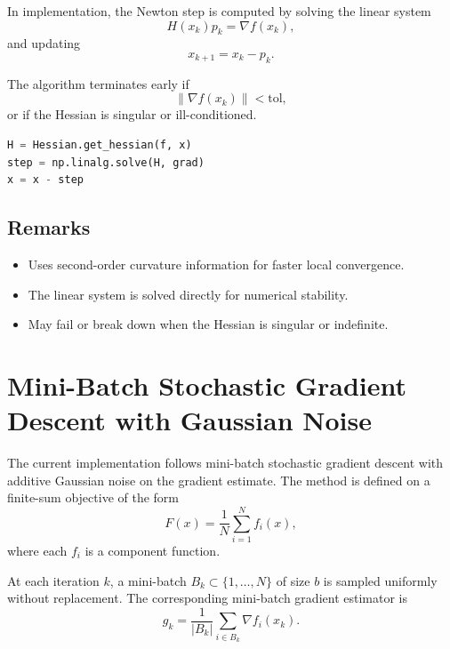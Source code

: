 \documentclass[12pt,a4paper]{report}
\begin{document}
In implementation, the Newton step is computed by solving the linear system
\begin{equation}
H(x_k) p_k = \nabla f(x_k),
\end{equation}
and updating
\begin{equation}
x_{k+1} = x_k - p_k.
\end{equation}

The algorithm terminates early if
\begin{equation}
\|\nabla f(x_k)\| < \text{tol},
\end{equation}
or if the Hessian is singular or ill-conditioned.

\begin{lstlisting}[language=Python]
H = Hessian.get_hessian(f, x)
step = np.linalg.solve(H, grad)
x = x - step
\end{lstlisting}

\subsection*{Remarks}
\begin{itemize}
    \item Uses second-order curvature information for faster local convergence.
    \item The linear system is solved directly for numerical stability.
    \item May fail or break down when the Hessian is singular or indefinite.
\end{itemize}

\section{Mini-Batch Stochastic Gradient Descent with Gaussian Noise}

The current implementation follows mini-batch stochastic gradient descent with additive Gaussian noise on the gradient estimate. The method is defined on a finite-sum objective of the form
\begin{equation}
F(x) = \frac{1}{N}\sum_{i=1}^{N} f_i(x),
\end{equation}
where each $f_i$ is a component function.

At each iteration $k$, a mini-batch $B_k \subset \{1,\dots,N\}$ of size $b$ is sampled uniformly without replacement. The corresponding mini-batch gradient estimator is
\begin{equation}
g_k = \frac{1}{|B_k|}\sum_{i \in B_k} \nabla f_i(x_k).
\end{equation}
\end{document}
